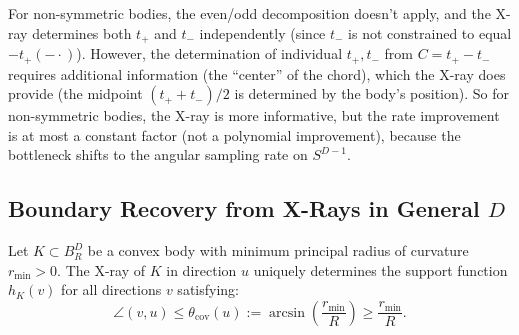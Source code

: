 \begin{remark}
For non-symmetric bodies, the even/odd decomposition doesn't apply, and the X-ray determines both $t_+$ and $t_-$ independently (since $t_-$ is not constrained to equal $-t_+(-\cdot)$). However, the determination of individual $t_+, t_-$ from $C = t_+ - t_-$ requires additional information (the ``center'' of the chord), which the X-ray does provide (the midpoint $(t_+ + t_-)/2$ is determined by the body's position). So for non-symmetric bodies, the X-ray is more informative, but the rate improvement is at most a constant factor (not a polynomial improvement), because the bottleneck shifts to the angular sampling rate on $S^{D-1}$.
\end{remark}


\subsection{Boundary Recovery from X-Rays in General $D$}

\begin{lemma}
\label{lem:coverage}
Let $K \subset B_R^D$ be a convex body with minimum principal radius of curvature $r_{\min} > 0$. The X-ray of $K$ in direction $u$ uniquely determines the support function $h_K(v)$ for all directions $v$ satisfying:
\[
  \angle(v, u) \leq \theta_{\mathrm{cov}}(u) := \arcsin\!\left(\frac{r_{\min}}{R}\right) \geq \frac{r_{\min}}{R}.
\]
\end{lemma}

